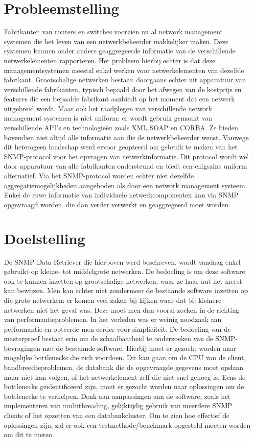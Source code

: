 \section{Probleemstelling}
Fabrikanten van routers en switches voorzien nu al network management systemen die het leven van een netwerkbeheerder makkelijker maken.
Deze systemen kunnen onder andere geaggregeerde informatie van de verschillende netwerkelementen rapporteren.
Het probleem hierbij echter is dat deze managementsystemen meestal enkel werken voor netwerkelementen van dezelfde fabrikant.
Grootschalige netwerken bestaan doorgaans echter uit apparatuur van verschillende fabrikanten,
typisch bepaald door het afwegen van de kostprijs en features die een bepaalde fabrikant aanbiedt op het moment dat een netwerk uitgebreid wordt. %
Maar ook het raadplegen van verschillende network management systemen is niet uniform:
er wordt gebruik gemaakt van verschillende API's en technologieën zoals XML SOAP en CORBA.
Ze bieden bovendien niet altijd alle informatie aan die de netwerkbeheerder wenst.
Vanwege dit heterogeen landschap werd ervoor geopteerd om gebruik te maken van het SNMP-protocol voor het opvragen van netwerkinformatie.
Dit protocol wordt wel door apparatuur van alle fabrikanten ondersteund en biedt een enigszins uniform alternatief.
Via het SNMP-protocol worden echter niet dezelfde aggregatiemogelijkheden aangeboden als door een network management systeem.
Enkel de ruwe informatie van individuele netwerkcomponenten kan via SNMP opgevraagd worden, die dan verder verwerkt en geaggregeerd moet worden.


\section{Doelstelling}
De SNMP Data Retriever die hierboven werd beschreven, wordt vandaag enkel gebruikt op kleine- tot middelgrote netwerken.
De bedoeling is om deze software ook te kunnen inzetten op grootschalige netwerken, waar ze haar nut het meest kan bewijzen.
Men kan echter niet zondermeer de bestaande software inzetten op die grote netwerken: er komen veel zaken bij kijken
waar dat bij kleinere netwerken niet het geval was. Deze moet men dan vooral zoeken in de richting van performantieproblemen.
In het verleden was er weinig noodzaak aan performantie en opteerde men eerder voor simpliciteit.
De bedoeling van de masterproef bestaat erin om de schaalbaarheid te onderzoeken van de SNMP-bevragingen met de bestaande software.
Hierbij moet er gezocht worden naar mogelijke bottlenecks die zich voordoen.
Dit kan gaan om de CPU van de client, bandbreedteproblemen, de databank die de opgevraagde gegevens moet opslaan maar niet kan volgen,
of het netwerkelement zelf die niet snel genoeg is.
Eens de bottlenecks geïdentificeerd zijn, moet er gezocht worden naar oplossingen om de bottlenecks te verhelpen.
Denk aan aanpassingen aan de software, zoals het implementeren van multithreading, gelijktijdig gebruik van meerdere SNMP clients of
het opzetten van een databankcluster.
Om te zien hoe effectief de oplossingen zijn, zal er ook een testmethode/benchmark opgesteld moeten worden om dit te meten.

